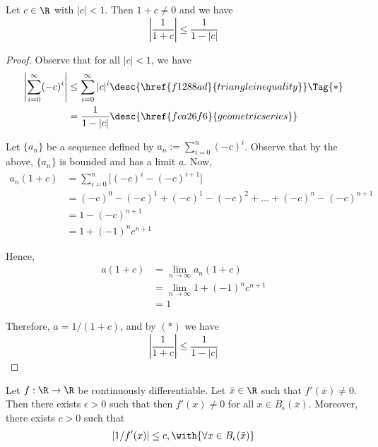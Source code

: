 \label{aa9e48d}

Let $c\in\R$ with $|c|<1$. Then $1+c\neq0$ and we have
$$
  \left|\frac1{1+c}\right|\leq\frac1{1-|c|}
$$

\begin{proof}
  Observe that for all $|c|<1$, we have
  \begin{align*}
    \left|\sum_{i=0}^\infty(-c)^i\right|
     &\leq\sum_{i=0}^\infty|c|^i\desc{\href{f1288ad}{triangle inequality}}\Tag{*} \\
     &=\frac{1}{1-|c|}\desc{\href{fca26f6}{geometric series}}
  \end{align*}

  Let $\{a_n\}$ be a sequence defined by $a_n:=\sum_{i=0}^n(-c)^i$. Observe
  that by the above, $\{a_n\}$ is bounded and has a limit $a$. Now,
  \begin{align*}
    a_n(1+c) &=\sum_{i=0}^n\bigl[(-c)^i-(-c)^{i+1}\bigr]            \\
             &=(-c)^0-(-c)^1+(-c)^1-(-c)^2+\ldots+(-c)^n-(-c)^{n+1} \\
             &=1-(-c)^{n+1}                                         \\
             &=1+(-1)^nc^{n+1}
  \end{align*}

  Hence,
  \begin{align*}
    a(1+c) &=\lim_{n\to\infty}a_n(1+c)        \\
           &=\lim_{n\to\infty}1+(-1)^nc^{n+1} \\
           &=1
  \end{align*}

  Therefore, $a=1/(1+c)$, and by $(*)$ we have
  $$
    \left|\frac1{1+c}\right|\leq\frac1{1-|c|}
  $$
\end{proof}

\label{ceb0475}

Let $f:\R\to\R$ be continuously differentiable. Let $\bar x\in\R$ such that
$f'(\bar x)\neq0$. Then there exists $\epsilon>0$ such that then $f'(x)\neq0$
for all $x\in B_\epsilon(\bar x)$. Moreover, there exists $c>0$ such that
$$
  |1/f'(x)|\leq c,\with{\forall x\in B_\epsilon(\bar x)}
$$

